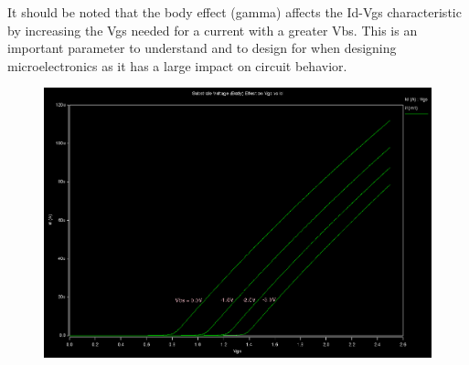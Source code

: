 \documentclass[12pt]{article}
\begin{document}
It should be noted that the body effect (gamma) affects the Id-Vgs characteristic by increasing the Vgs needed for a current with a greater Vbs. This is an important parameter to understand and to design for when designing microelectronics as it has a large impact on circuit behavior.
\FloatBarrier
\begin{figure}[h!]
\begin{center}
 \includegraphics[scale=0.35]{./body.png}
\end{center}
\end{figure}
\FloatBarrier
\end{document}
